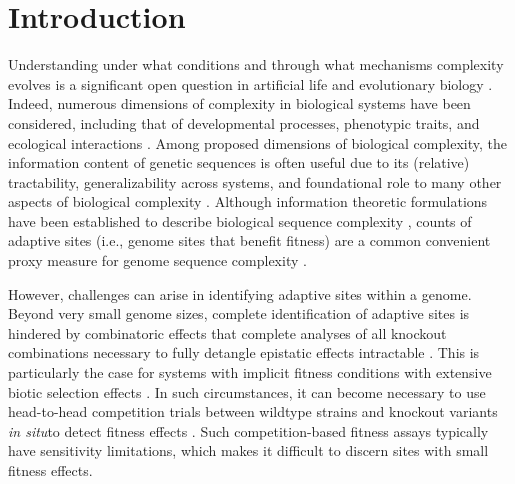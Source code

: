 \section{Introduction} \label{sec:introduction}

Understanding under what conditions and through what mechanisms complexity evolves is a significant open question in artificial life and evolutionary biology \citep{taylor2016open,pigliucci2009extended}.
Indeed, numerous dimensions of complexity in biological systems have been considered, including that of developmental processes, phenotypic traits, and ecological interactions \citep{szathmary2001can,mcshea2000functional}.
Among proposed dimensions of biological complexity, the information content of genetic sequences is often useful due to its (relative) tractability, generalizability across systems, and foundational role to many other aspects of biological complexity \citep{adami2002complexity}.
Although information theoretic formulations have been established to describe biological sequence complexity \citep{weiss2000information}, counts of adaptive sites (i.e., genome sites that benefit fitness) are a common convenient proxy measure for genome sequence complexity \citep{dolson2019modes}.

However, challenges can arise in identifying adaptive sites within a genome.
Beyond very small genome sizes, complete identification of adaptive sites is hindered by combinatoric effects that complete analyses of all knockout combinations necessary to fully detangle epistatic effects intractable \citep{nitash2021information,adami2000evolution}.
This is particularly the case for systems with implicit fitness conditions with extensive biotic selection effects \citep{moreno2022exploring,channon2000towards}.
In such circumstances, it can become necessary to use head-to-head competition trials between wildtype strains and knockout variants \textit{in situ}to detect fitness effects \citep{moreno2021case}.
Such competition-based fitness assays typically have sensitivity limitations, which makes it difficult to discern sites with small fitness effects.



